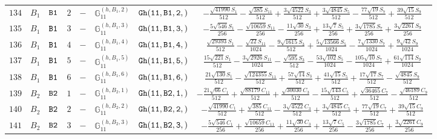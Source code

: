 \documentclass[fleqn,8pt]{jsarticle}
\begin{document}
\begin{table}[ht!]
\begin{center}
\begin{tabular}{cccccccc}
$ 134 $ & $ B_{1} $ & $ {\tt B1} $ & $ 2 $ & $ - $ & $ \mathbb{G}_{11}^{(h,B_{1},2)} $ & $ {\tt Gh(11,B1,2,)} $ & $ - \frac{\sqrt{41990} S_{1}}{512} - \frac{\sqrt{385} S_{11}}{512} + \frac{3 \sqrt{4522} S_{3}}{512} + \frac{3 \sqrt{4845} S_{5}}{512} - \frac{77 \sqrt{19} S_{7}}{512} + \frac{39 \sqrt{15} S_{9}}{512} $ \\
$ 135 $ & $ B_{1} $ & $ {\tt B1} $ & $ 3 $ & $ - $ & $ \mathbb{G}_{11}^{(h,B_{1},3)} $ & $ {\tt Gh(11,B1,3,)} $ & $ - \frac{5 \sqrt{546} S_{1}}{256} - \frac{\sqrt{10659} S_{11}}{256} - \frac{11 \sqrt{30} S_{3}}{256} + \frac{13 \sqrt{7} S_{5}}{256} + \frac{3 \sqrt{1785} S_{7}}{256} + \frac{3 \sqrt{2261} S_{9}}{256} $ \\
$ 136 $ & $ B_{1} $ & $ {\tt B1} $ & $ 4 $ & $ - $ & $ \mathbb{G}_{11}^{(h,B_{1},4)} $ & $ {\tt Gh(11,B1,4,)} $ & $ \frac{\sqrt{29393} S_{1}}{512} - \frac{\sqrt{22} S_{11}}{1024} - \frac{9 \sqrt{1615} S_{3}}{512} + \frac{5 \sqrt{13566} S_{5}}{1024} - \frac{7 \sqrt{1330} S_{7}}{1024} + \frac{9 \sqrt{42} S_{9}}{1024} $ \\
$ 137 $ & $ B_{1} $ & $ {\tt B1} $ & $ 5 $ & $ - $ & $ \mathbb{G}_{11}^{(h,B_{1},5)} $ & $ {\tt Gh(11,B1,5,)} $ & $ \frac{15 \sqrt{221} S_{1}}{512} - \frac{3 \sqrt{2926} S_{11}}{1024} - \frac{\sqrt{595} S_{3}}{512} - \frac{53 \sqrt{102} S_{5}}{1024} - \frac{105 \sqrt{10} S_{7}}{1024} + \frac{61 \sqrt{114} S_{9}}{1024} $ \\
$ 138 $ & $ B_{1} $ & $ {\tt B1} $ & $ 6 $ & $ - $ & $ \mathbb{G}_{11}^{(h,B_{1},6)} $ & $ {\tt Gh(11,B1,6,)} $ & $ \frac{21 \sqrt{130} S_{1}}{512} - \frac{\sqrt{124355} S_{11}}{512} + \frac{57 \sqrt{14} S_{3}}{512} + \frac{41 \sqrt{15} S_{5}}{512} + \frac{17 \sqrt{17} S_{7}}{512} - \frac{\sqrt{4845} S_{9}}{512} $ \\
$ 139 $ & $ B_{2} $ & $ {\tt B2} $ & $ 1 $ & $ - $ & $ \mathbb{G}_{11}^{(h,B_{2},1)} $ & $ {\tt Gh(11,B2,1,)} $ & $ - \frac{21 \sqrt{66} C_{1}}{512} + \frac{\sqrt{88179} C_{11}}{512} + \frac{\sqrt{30030} C_{3}}{512} - \frac{15 \sqrt{143} C_{5}}{512} + \frac{\sqrt{36465} C_{7}}{512} - \frac{\sqrt{46189} C_{9}}{512} $ \\
$ 140 $ & $ B_{2} $ & $ {\tt B2} $ & $ 2 $ & $ - $ & $ \mathbb{G}_{11}^{(h,B_{2},2)} $ & $ {\tt Gh(11,B2,2,)} $ & $ - \frac{\sqrt{41990} C_{1}}{512} + \frac{\sqrt{385} C_{11}}{512} - \frac{3 \sqrt{4522} C_{3}}{512} + \frac{3 \sqrt{4845} C_{5}}{512} + \frac{77 \sqrt{19} C_{7}}{512} + \frac{39 \sqrt{15} C_{9}}{512} $ \\
$ 141 $ & $ B_{2} $ & $ {\tt B2} $ & $ 3 $ & $ - $ & $ \mathbb{G}_{11}^{(h,B_{2},3)} $ & $ {\tt Gh(11,B2,3,)} $ & $ - \frac{5 \sqrt{546} C_{1}}{256} + \frac{\sqrt{10659} C_{11}}{256} + \frac{11 \sqrt{30} C_{3}}{256} + \frac{13 \sqrt{7} C_{5}}{256} - \frac{3 \sqrt{1785} C_{7}}{256} + \frac{3 \sqrt{2261} C_{9}}{256} $ \\

\end{tabular}
\end{center}
\end{table}
\end{document}
